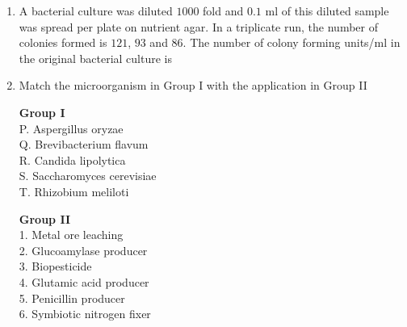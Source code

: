 \documentclass[journal,12pt,onecolumn]{IEEEtran}
\theoremstyle{remark}
\begin{document}
\begin{enumerate}
    \item A bacterial culture was diluted $1000$ fold and $0.1$ ml of this diluted sample was spread per plate on nutrient agar. In a triplicate run, the number of colonies formed is $121$, $93$ and $86$. The number of colony forming units/ml in the original bacterial culture is

    \hfill{}

    \begin{enumerate}
    \end{enumerate}

    \item Match the microorganism in Group I with the application in Group II
    
    \begin{minipage}[t]{0.5\textwidth}
        \textbf{Group I} \\
        P. Aspergillus oryzae \\
        Q. Brevibacterium flavum \\
        R. Candida lipolytica \\
        S. Saccharomyces cerevisiae \\
        T. Rhizobium meliloti
    \end{minipage}%
    \begin{minipage}[t]{0.5\textwidth}
        \textbf{Group II} \\
        1. Metal ore leaching \\
        2. Glucoamylase producer \\
        3. Biopesticide \\
        4. Glutamic acid producer \\
        5. Penicillin producer \\
        6. Symbiotic nitrogen fixer
    \end{minipage}

    \hfill{}

    \begin{enumerate}
    \end{enumerate}


\end{enumerate}
\end{document}
